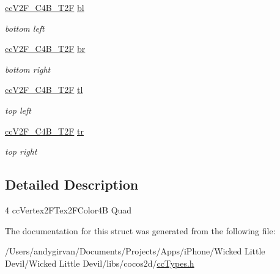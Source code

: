 \begin{DoxyCompactItemize}
\item 
\hypertarget{struct__cc_v2_f___c4_b___t2_f___quad_a02c900b10f2ef26ccd094ef2db4761d4}{\hyperlink{cc_types_8h_aa3f3456208d3090768d2c9bff64412ac}{cc\-V2\-F\-\_\-\-C4\-B\-\_\-\-T2\-F} \hyperlink{struct__cc_v2_f___c4_b___t2_f___quad_a02c900b10f2ef26ccd094ef2db4761d4}{bl}}\label{struct__cc_v2_f___c4_b___t2_f___quad_a02c900b10f2ef26ccd094ef2db4761d4}

\begin{DoxyCompactList}\small\item\em bottom left \end{DoxyCompactList}\item 
\hypertarget{struct__cc_v2_f___c4_b___t2_f___quad_a598ad26ac9418b554e00ba73d2ae60d5}{\hyperlink{cc_types_8h_aa3f3456208d3090768d2c9bff64412ac}{cc\-V2\-F\-\_\-\-C4\-B\-\_\-\-T2\-F} \hyperlink{struct__cc_v2_f___c4_b___t2_f___quad_a598ad26ac9418b554e00ba73d2ae60d5}{br}}\label{struct__cc_v2_f___c4_b___t2_f___quad_a598ad26ac9418b554e00ba73d2ae60d5}

\begin{DoxyCompactList}\small\item\em bottom right \end{DoxyCompactList}\item 
\hypertarget{struct__cc_v2_f___c4_b___t2_f___quad_a26a1e0afb6cf474918b5ce137c499b8a}{\hyperlink{cc_types_8h_aa3f3456208d3090768d2c9bff64412ac}{cc\-V2\-F\-\_\-\-C4\-B\-\_\-\-T2\-F} \hyperlink{struct__cc_v2_f___c4_b___t2_f___quad_a26a1e0afb6cf474918b5ce137c499b8a}{tl}}\label{struct__cc_v2_f___c4_b___t2_f___quad_a26a1e0afb6cf474918b5ce137c499b8a}

\begin{DoxyCompactList}\small\item\em top left \end{DoxyCompactList}\item 
\hypertarget{struct__cc_v2_f___c4_b___t2_f___quad_ac1fdf89b356fe28c036c1475ea1fa8c2}{\hyperlink{cc_types_8h_aa3f3456208d3090768d2c9bff64412ac}{cc\-V2\-F\-\_\-\-C4\-B\-\_\-\-T2\-F} \hyperlink{struct__cc_v2_f___c4_b___t2_f___quad_ac1fdf89b356fe28c036c1475ea1fa8c2}{tr}}\label{struct__cc_v2_f___c4_b___t2_f___quad_ac1fdf89b356fe28c036c1475ea1fa8c2}

\begin{DoxyCompactList}\small\item\em top right \end{DoxyCompactList}\end{DoxyCompactItemize}


\subsection{Detailed Description}
4 cc\-Vertex2\-F\-Tex2\-F\-Color4\-B Quad 

The documentation for this struct was generated from the following file\-:\begin{DoxyCompactItemize}
\item 
/\-Users/andygirvan/\-Documents/\-Projects/\-Apps/i\-Phone/\-Wicked Little Devil/\-Wicked Little Devil/libs/cocos2d/\hyperlink{cc_types_8h}{cc\-Types.\-h}\end{DoxyCompactItemize}
